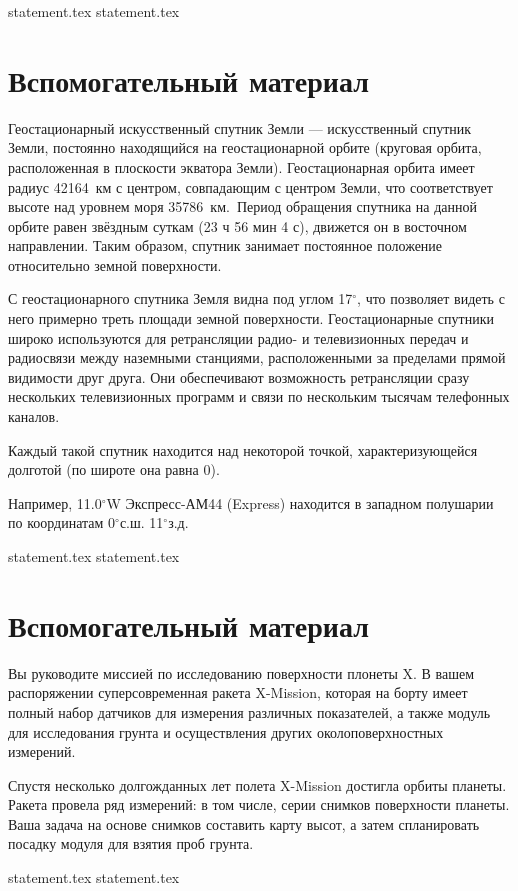 {statement.tex}
{statement.tex}

\section*{Вспомогательный материал}

Геостационарный искусственный спутник Земли — искусственный спутник Земли, постоянно находящийся на геостационарной орбите (круговая орбита, расположенная в плоскости экватора Земли). Геостационарная орбита имеет радиус 42164~км с центром, совпадающим с центром Земли, что соответствует высоте над уровнем моря 35786~км. Период обращения спутника на данной орбите равен звёздным суткам (23 ч 56 мин 4 с), движется он в восточном направлении. Таким образом, спутник занимает постоянное положение относительно земной поверхности.

С геостационарного спутника Земля видна под углом 17$^\circ$, что позволяет видеть с него примерно треть площади земной поверхности. Геостационарные спутники широко используются для ретрансляции радио- и телевизионных передач и радиосвязи между наземными станциями, расположенными за пределами прямой видимости друг друга. Они обеспечивают возможность ретрансляции сразу нескольких телевизионных программ и связи по нескольким тысячам телефонных каналов.

Каждый такой спутник находится над некоторой точкой, характеризующейся долготой (по широте она равна 0). 

Например, 11.0$^\circ$W Экспресс-АМ44 (Express) находится в западном полушарии по координатам 0$^\circ$с.ш. 11$^\circ$з.д.

{statement.tex}
{statement.tex}

\section*{Вспомогательный материал}

Вы руководите миссией по исследованию поверхности плонеты X. В вашем распоряжении суперсовременная ракета X-Mission, которая на борту имеет полный набор датчиков для измерения различных показателей, а также модуль для исследования грунта и осуществления других околоповерхностных измерений.

Спустя несколько долгожданных лет полета X-Mission достигла орбиты планеты. Ракета провела ряд измерений: в том числе, серии снимков поверхности планеты. Ваша задача на основе снимков составить карту высот, а затем спланировать посадку модуля для взятия проб грунта. 

{statement.tex}
{statement.tex}